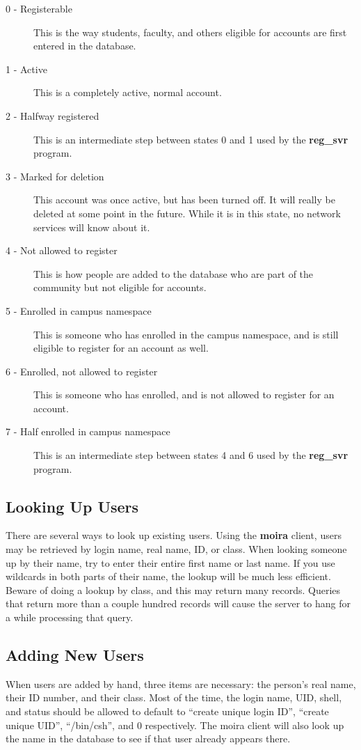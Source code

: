 \label{accountstatus}
\begin{description}
\item[0 - Registerable] This is the way students, faculty, and others
eligible for accounts are first entered in the database.
\item[1 - Active] This is a completely active, normal account.
\item[2 - Halfway registered] This is an intermediate step between states 0
and 1 used by the {\bf reg\_svr} program.
\item[3 - Marked for deletion] This account was once active, but has been
turned off.  It will really be deleted at some point in the future.
While it is in this state, no network services will know about it.
\item[4 - Not allowed to register] This is how people are added to the
database who are part of the community but not eligible for accounts.
\item[5 - Enrolled in campus namespace] This is someone who has enrolled in
the campus namespace, and is still eligible to register for an account
as well.
\item[6 - Enrolled, not allowed to register] This is someone who has
enrolled, and is not allowed to register for an account.
\item[7 - Half enrolled in campus namespace] This is an intermediate step
between states 4 and 6 used by the {\bf reg\_svr} program.
\end{description}

\subsection{Looking Up Users}

There are several ways to look up existing users.  Using the {\bf moira}
client, users may be retrieved by login name, real name, ID, or class.
When looking someone up by their name, try to enter their entire first
name or last name.  If you use wildcards in both parts of their name,
the lookup will be much less efficient.  Beware of doing a lookup by
class, and this may return many records.  Queries that return more
than a couple hundred records will cause the server to hang for a
while processing that query.

\subsection{Adding New Users}
When users are added by hand, three items are necessary: the person's
real name, their ID number, and their class.  Most of the time, the
login name, UID, shell, and status should be allowed to default to
``create unique login ID'', ``create unique UID'', ``/bin/csh'', and 0
respectively.  The moira client will also look up the name in the
database to see if that user already appears there.

